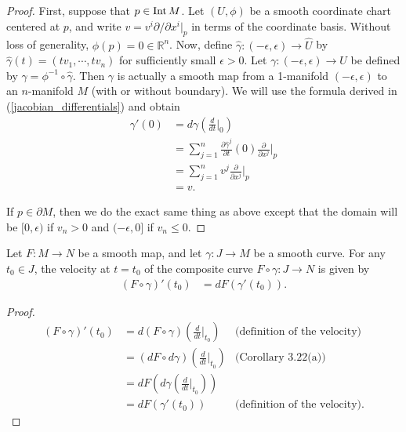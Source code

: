 \begin{proof}
  First, suppose that $p \in \operatorname{Int} M$.
  Let $(U, \phi)$ be a smooth coordinate chart centered at $p$, and write $v = v^i \partial / \partial x^i\vert_p$ in terms of the coordinate basis.
  Without loss of generality, $\phi(p) = 0 \in \mathbb{R}^n$.
  Now, define $\hat{\gamma}: (-\epsilon, \epsilon) \rightarrow \hat{U}$ by $\hat{\gamma}(t) = (tv_1, \cdots, tv_n)$ for sufficiently small $\epsilon > 0$.
  Let $\gamma: (-\epsilon, \epsilon) \rightarrow U$ be defined by $\gamma = \phi^{-1} \circ \hat{\gamma}$.
  Then $\gamma$ is actually a smooth map from a 1-manifold $(-\epsilon, \epsilon)$ to an $n$-manifold $M$ (with or without boundary).
  We will use the formula derived in (\ref{jacobian_differentials}) and obtain
  \begin{align*}
    \gamma'(0)
      &= d\gamma(\frac{d}{dt}\Big\vert_{0}) \\
      &= \sum_{j=1}^{n}\frac{\partial\hat{\gamma}^j}{\partial t}(0)\frac{\partial}{\partial x^j}\Big\vert_{p} \\
      &= \sum_{j=1}^{n}v^j\frac{\partial}{\partial x^j}\Big\vert_{p} \\
      &= v.
  \end{align*}

  If $p \in \partial M$, then we do the exact same thing as above except that the domain will be $[0, \epsilon)$ if $v_n > 0$ and $(-\epsilon, 0]$ if $v_n \leq 0$.
\end{proof}

\begin{customthm}{3.24}
  Let $F: M \rightarrow N$ be a smooth map, and let $\gamma: J \rightarrow M$ be a smooth curve.
  For any $t_0 \in J$, the velocity at $t = t_0$ of the composite curve $F \circ \gamma: J \rightarrow N$ is given by
  \begin{align*}
    (F \circ \gamma)'(t_0) &= dF(\gamma'(t_0)).
  \end{align*}
\end{customthm}

\begin{proof}
  $ $
  \begin{align*}
    (F \circ \gamma)'(t_0)
      &= d(F \circ \gamma)(\frac{d}{dt}\Big\vert_{t_0}) & \text{(definition of the velocity)} \\
      &= (dF \circ d\gamma)(\frac{d}{dt}\Big\vert_{t_0}) & \text{(Corollary 3.22(a))} \\
      &= dF(d\gamma(\frac{d}{dt}\Big\vert_{t_0})) \\
      &= dF(\gamma'(t_0)) & \text{(definition of the velocity)}.
  \end{align*}
\end{proof}

